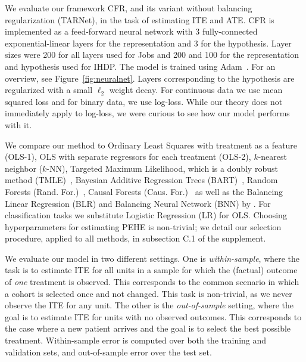 \documentclass{article}
\def\tarnet{{TARNet}}
\begin{document}
We evaluate our framework CFR, and its variant without balancing regularization (\tarnet{}), in the task of estimating ITE and ATE. CFR is implemented as a feed-forward neural network with 3 fully-connected exponential-linear layers for the representation and 3 for the hypothesis. Layer sizes were 200 for all layers used for Jobs and 200 and 100 for the representation and hypothesis used for IHDP. The model is trained using Adam~\citep{kingma2014adam}. For an overview, see Figure~\ref{fig:neuralnet}. Layers corresponding to the hypothesis are regularized with a small $\ell_2$ weight decay.  For continuous data we use mean squared loss and for binary data, we use log-loss. While our theory does not immediately apply to log-loss, we were curious to see how our model performs with it. 

We compare our method to Ordinary Least Squares with treatment as a feature (OLS-1), OLS with separate regressors for each treatment (OLS-2), $k$-nearest neighbor ($k$-NN), Targeted Maximum Likelihood, which is a doubly robust method (TMLE)~\citep{gruber2011tmle}, Bayesian Additive Regression Trees (BART)~\citep{chipman2010bart,bayestree}, Random Forests (Rand. For.)~\citep{breiman2001random}, Causal Forests  (Caus. For.)~\citep{wager2015estimation} as well as the Balancing Linear Regression (BLR) and Balancing Neural Network (BNN) by \citet{johansson2016counterfactual}.
For classification tasks we substitute Logistic Regression (LR) for OLS.  Choosing hyperparameters for estimating PEHE is non-trivial; we detail our selection procedure, applied to all methods, in subsection C.1 of the supplement.



We evaluate our model in two different settings. One is \emph{within-sample}, where the task is to estimate ITE for all units in a sample for which the (factual) outcome of \emph{one} treatment is observed. This corresponds to the common scenario in which a cohort is selected once and not changed. This task is non-trivial, as we never observe the ITE for any unit. The other is the \emph{out-of-sample} setting, where the goal is to estimate ITE for units with no observed outcomes. This corresponds to the case where a new patient arrives and the goal is to select the best possible treatment. Within-sample error is computed over both the training and validation sets, and out-of-sample error over the test set.

\vskip -7pt
\end{document}
